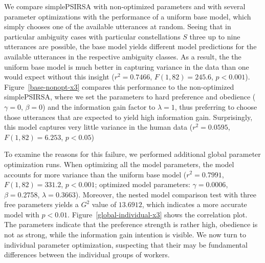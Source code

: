 \documentclass[10pt,a4paper]{article}
\begin{document}
We compare simplePSIRSA with non-optimized parameters and with several parameter optimizations with the performance of a uniform base model, which simply chooses one of the available utterances at random. 
Seeing that in particular ambiguity cases with particular constellations $S$ three up to nine utterances are possible, the base model yields different model predictions for the available utterances in the respective ambiguity classes. 
As a result, the the uniform base model is much better in capturing variance in the data than one would expect without this insight ($r^2=0.7466$, $F(1,82) = 245.6$, $p<0.001$).
Figure~\ref{base-nonopt-x3} compares this performance to the non-optimized simplePSIRSA, where we set the parameters to hard preference and obedience ($\gamma=0$, $\beta=0$) and the information gain factor to $\lambda=1$, thus preferring to choose those utterances that are expected to yield high information gain. 
Surprisingly, this model captures very little variance in
the human data ($r^2=0.0595$, $F(1,82) = 6.253$, $p  < 0.05$)


To examine the reasons for this failure, we performed additional global parameter optimization runs.
When optimizing all the model parameters, the model accounts for more variance than the uniform base model ($r^2=0.7991$, $F(1,82) = 331.2$, $p<0.001$; optimized model parameters: $\gamma=0.0006$, $\beta=0.2758$, $\lambda=0.3663$).
Moreover, the nested model comparison test with three free parameters yields a $G^2$ value of $13.6912$, which indicates a more accurate model with $p<0.01$. 
Figure~\ref{global-individual-x3} shows the correlation plot. 
The parameters indicate that the preference strength is rather high, obedience is not as strong, while the information gain intention is visible. 
We now turn to individual parameter optimization, suspecting that their may be fundamental differences between the individual groups of workers. 



\end{document}
